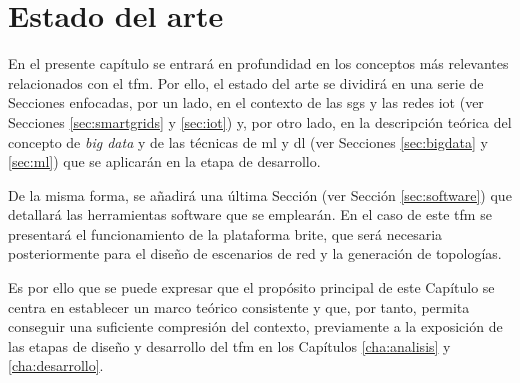 \chapter{Estado del arte}
\label{estadoArte}

En el presente capítulo se entrará en profundidad en los conceptos más relevantes relacionados con el \gls{tfm}. Por ello, el estado del arte se dividirá en una serie de Secciones enfocadas, por un lado, en el contexto de las \gls{sg}s y las redes \acrshort{iot} (ver Secciones \ref{sec:smartgrids} y \ref{sec:iot}) y, por otro lado, en la descripción teórica del concepto de \textit{big data} y de las técnicas de \gls{ml} y \gls{dl} (ver Secciones \ref{sec:bigdata} y \ref{sec:ml}) que se aplicarán en la etapa de desarrollo. 

\vspace{3mm}

De la misma forma, se añadirá una última Sección (ver Sección \ref{sec:software}) que detallará las herramientas software que se emplearán. En el caso de este \gls{tfm} se presentará el funcionamiento de la plataforma \gls{brite}, que será necesaria posteriormente para el diseño de escenarios de red y la generación de topologías. 

\vspace{3mm}

Es por ello que se puede expresar que el propósito principal de este Capítulo se centra en establecer un marco teórico consistente y que, por tanto, permita conseguir una suficiente compresión del contexto, previamente a la exposición de las etapas de diseño y desarrollo del \gls{tfm} en los Capítulos \ref{cha:analisis} y \ref{cha:desarrollo}.

\vspace{3mm}















